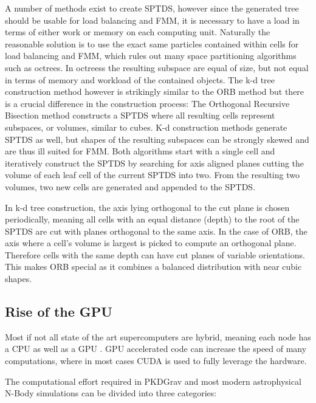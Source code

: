 \documentclass[]{article}
\begin{document}
A number of methods exist to create SPTDS, however since the generated tree should be usable for load balancing and FMM, it is necessary to have a load in terms of either work or memory on each computing unit. Naturally the reasonable solution is to use the exact same particles contained within cells for load balancing and FMM, which rules out many space partitioning algorithms such as octrees. In octreess the resulting subspace are equal of size, but not equal in terms of memory and workload of the contained objects. The k-d tree construction method however is strikingly similar to the ORB method but there is a crucial difference in the construction process: The Orthogonal Recursive Bisection method constructs a SPTDS where all resulting cells represent subspaces, or volumes, similar to cubes. K-d construction methods generate SPTDS as well, but shapes of the resulting subspaces can be strongly skewed and are thus ill suited for FMM. Both algorithms start with a single cell and iteratively construct the SPTDS by searching for axis aligned planes cutting the volume of each leaf cell of the current SPTDS into two. From the resulting two volumes, two new cells are generated and appended to the SPTDS. 

In k-d tree construction, the axis lying orthogonal to the cut plane is chosen periodically, meaning all cells with an equal distance (depth) to the root of the SPTDS are cut with planes orthogonal to the same axis. In the case of ORB, the axis where a cell's volume is largest is picked to compute an orthogonal plane. Therefore cells with the same depth can have cut planes of variable orientations. This makes ORB special as it combines a balanced distribution with near cubic shapes.  

\subsection{Rise of the GPU}

Most if not all state of the art supercomputers are hybrid, meaning each node has a CPU as well as a GPU \cite{TOP500}. GPU accelerated code can increase the speed of many computations, where in most cases CUDA is used to fully leverage the hardware. 

The computational effort required in PKDGrav and most modern astrophysical N-Body simulations can be divided into three categories:
\end{document}
